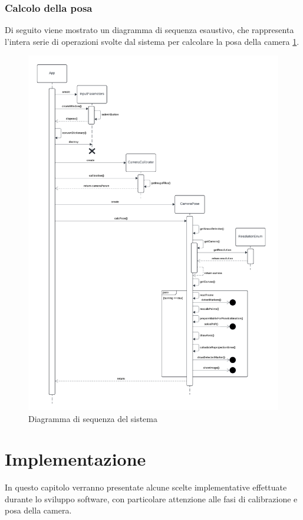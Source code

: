 \documentclass[12pt,a4paper,openright,twoside]{book}
\begin{document}
\subsection{Calcolo della posa}
Di seguito viene mostrato un diagramma di sequenza esaustivo, che rappresenta l'intera serie di operazioni svolte dal sistema per calcolare la posa della camera \ref{fig:sequence_diagram}.
\begin{figure}[h!]
	\centering
	\includegraphics[width=0.9\linewidth]{./figures/UML/sequenceDiagram.pdf}
	\caption{Diagramma di sequenza del sistema}
	\label{fig:sequence_diagram}
\end{figure}

\chapter{Implementazione}
In questo capitolo verranno presentate alcune scelte implementative effettuate durante lo sviluppo software, con particolare attenzione alle fasi di calibrazione e posa della camera.
\end{document}
